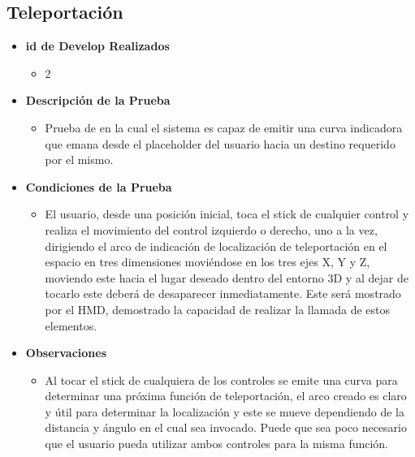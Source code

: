 \begin{itemize}
\begin{figure}[H]
\begin{center}
       	\end{center} 
    \end{figure}
\end{itemize}

\subsection{Teleportación}
\begin{itemize}
    \item \textbf{id de Develop Realizados}
    \begin{itemize}
        \item 2
    \end{itemize}
    \item \textbf{Descripción de la Prueba}
    \begin{itemize}
        \item Prueba de en la cual el sistema es capaz de emitir una curva indicadora que emana desde el  placeholder del usuario hacia un destino requerido por el mismo. 
    \end{itemize}
    \item \textbf{Condiciones de la Prueba}
    \begin{itemize}
        \item El usuario, desde una posición inicial, toca el stick de cualquier control y realiza el movimiento del control izquierdo o derecho, uno a la vez, dirigiendo el arco  de indicación de localización de teleportación en el espacio en tres dimensiones moviéndose en los tres ejes X, Y y Z, moviendo este hacia el lugar deseado dentro del entorno 3D  y al dejar de tocarlo este deberá de desaparecer inmediatamente. Este será mostrado por el HMD, demostrado la capacidad de realizar la llamada de estos elementos.\\
    \end{itemize}
    \item \textbf{Observaciones}
    \begin{itemize}
        \item Al tocar el stick de cualquiera de los controles se emite una curva para determinar una próxima función de teleportación, el arco creado es claro y útil para determinar la localización y este se mueve dependiendo de la distancia y ángulo en el cual sea invocado. Puede que sea poco necesario que el usuario pueda utilizar ambos controles para la misma función.

\end{itemize}
\end{itemize}
